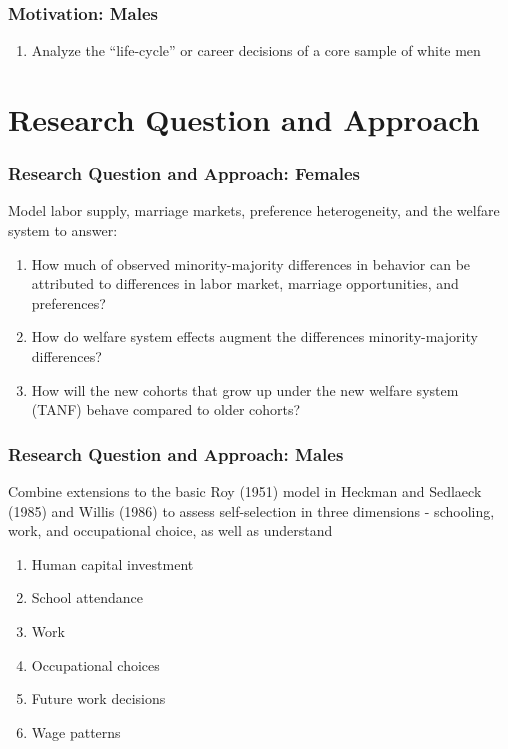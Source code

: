 \begin{frame}
	\frametitle{Motivation: Males}	
	\begin{enumerate}
		\item Analyze the ``life-cycle'' or career decisions of a core sample of white men
	\end{enumerate}
\end{frame}

\section{Research Question and Approach}
\begin{frame}
	\frametitle{Research Question and Approach: Females}
		\begin{wideitemize}
			\item Model labor supply, marriage markets, preference heterogeneity, and the welfare system to answer:
			\begin{enumerate}
			\item How much of observed minority-majority differences in behavior can be attributed to differences in labor market, marriage opportunities, and preferences?
			\item How do welfare system effects augment the differences minority-majority differences?
			\item How will the new cohorts that grow up under the new welfare system (TANF) behave compared to older cohorts?
			\end{enumerate}
		\end{wideitemize}	
\end{frame}

\begin{frame}
	\frametitle{Research Question and Approach: Males}
		\begin{wideitemize}
			\item Combine extensions to the basic Roy (1951) model in Heckman and Sedlaeck (1985) and Willis (1986) to assess self-selection in three dimensions - schooling, work, and occupational choice, as well as understand
			\begin{enumerate}
				\item Human capital investment
				\item School attendance
				\item Work
				\item Occupational choices
				\item Future work decisions
				\item Wage patterns
			\end{enumerate}			 
		\end{wideitemize}
\end{frame}

